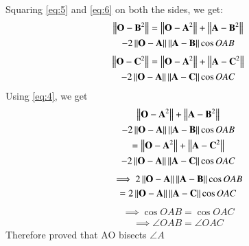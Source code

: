 \documentclass[journal,12pt,twocolumn]{IEEEtran}
\begin{document}
Squaring \eqref{eq:5} and \eqref{eq:6} on both the sides, we get:
\begin{multline}
    \left\lVert\mathbf{O-B}^2\right\rVert=\left\lVert\mathbf{O-A}^2\right\rVert+\left\lVert\mathbf{A-B}^2\right\rVert\\
    -2\left\lVert\mathbf{O-A}\right\rVert\left\lVert\mathbf{A-B}\right\rVert\cos OAB
\end{multline}
\begin{multline}
    \left\lVert\mathbf{O-C}^2\right\rVert=\left\lVert\mathbf{O-A}^2\right\rVert+\left\lVert\mathbf{A-C}^2\right\rVert\\
    -2\left\lVert\mathbf{O-A}\right\rVert\left\lVert\mathbf{A-C}\right\rVert\cos OAC
\end{multline}
Using \eqref{eq:4}, we get
\begin{multline}
    \left\lVert\mathbf{O-A}^2\right\rVert+\left\lVert\mathbf{A-B}^2\right\rVert \\
    -2\left\lVert\mathbf{O-A}\right\rVert\left\lVert\mathbf{A-B}\right\rVert\cos OAB \\
    = \left\lVert\mathbf{O-A}^2\right\rVert+\left\lVert\mathbf{A-C}^2\right\rVert \\
    -2\left\lVert\mathbf{O-A}\right\rVert\left\lVert\mathbf{A-C}\right\rVert\cos OAC
\end{multline}
\begin{multline}
    \implies 2\left\lVert\mathbf{O-A}\right\rVert\left\lVert\mathbf{A-B}\right\rVert\cos OAB \\
    = 2\left\lVert\mathbf{O-A}\right\rVert\left\lVert\mathbf{A-C}\right\rVert\cos OAC
\end{multline}
\begin{align}
    \implies \cos OAB=\cos OAC
\end{align}
\begin{align}
    \implies \angle OAB = \angle OAC
\end{align}
Therefore proved that AO bisects $\angle A$
%
%
%
%
\end{document}
